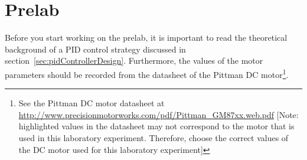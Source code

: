 \section{Prelab}
\label{sec:prelabDC-MotorControl1}
Before you start working on the prelab, it is important to read the theoretical background of a PID control strategy discussed in section~\ref{sec:pidControllerDesign}. Furthermore, the values of the motor parameters should be recorded from the datasheet of the Pittman DC motor\footnote{See the Pittman DC motor datasheet at \href{http://www.precisionmotorworks.com/pdf/Pittman_GM87xx.web.pdf}{http://www.precisionmotorworks.com/pdf/Pittman\_GM87xx.web.pdf} [Note: highlighted values in the datasheet may not correspond to the motor that is used in this laboratory experiment. Therefore, choose the correct values of the DC motor used for this laboratory experiment]}. %
%
%
